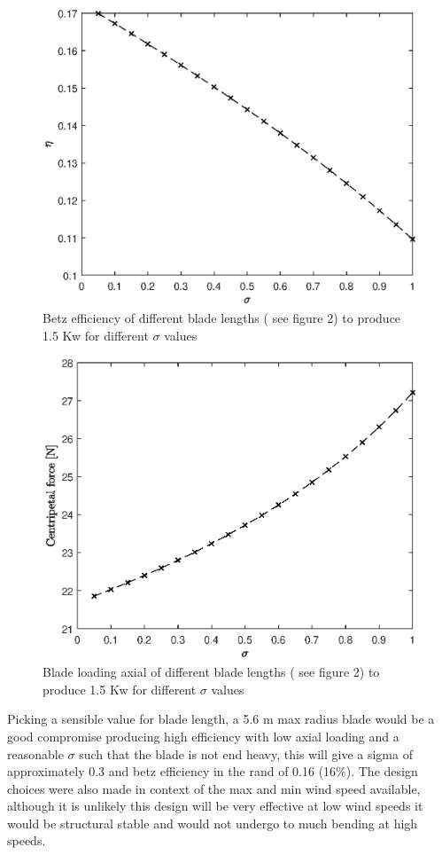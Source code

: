 \documentclass[11pt,a4paper]{article}
\begin{document}
\begin{figure}[H]
\centering
\includegraphics[width=300pts]{BETZ_EFFICIENY.eps}
\caption{Betz efficiency of different blade lengths ( see figure 2) to produce 1.5 Kw for different $\sigma$ values}
\end{figure}

\begin{figure}[H]
\centering
\includegraphics[width=300pts]{LOADING.eps}
\caption{Blade loading axial of different blade lengths ( see figure 2) to produce 1.5 Kw for different $\sigma$ values}
\end{figure}

Picking a sensible value for blade length, a 5.6 m max radius blade would be a good compromise producing high efficiency with low axial loading and a reasonable $\sigma$ such that the blade is not end heavy, this will give a sigma of approximately 0.3 and betz efficiency in the rand of 0.16 (16$\%$). The design choices were also made in context of the max and min wind speed available, although it is unlikely this design will be very effective at low wind speeds it would be structural stable and would not undergo to much bending at high speeds.
\end{document}
